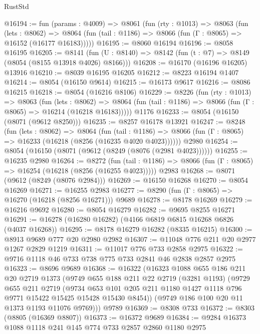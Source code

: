 \begin{lexlean}{RustStd}
\begin{coremodule}
@16194 := fun (params : @4009) =>
  @8061
    (fun (rty : @1013) =>
    @8063
      (fun (lets : @8062) =>
      @8064 (fun (tail : @1186) => @8066 (fun (Γ : @8065) => @16152 (@16177 @16183)))))
@16195 := @8060 @16194
@16196 := @8058 @16195
@16205 := @8141
    (fun (U : @8140) => @8142 (fun (t : @7) => @8149 (@8054 (@8155 @13918 @4026) @8166)))
@16208 := @16170 (@16196 @16205) @13916
@16210 := @8039 @16195 @16205
@16212 := @8223 @16194 @1407
@16214 := @8054 (@16150 @9614)
@16215 := @16173 @9617
@16216 := @8086 @16215
@16218 := @8054 (@16216 @8106)
@16229 := @8226
    (fun (rty : @1013) =>
    @8063
      (fun (lets : @8062) =>
      @8064 (fun (tail : @1186) => @8066 (fun (Γ : @8065) => @16214 (@16218 @16183)))))
    @1176
@16233 := @8054 (@16150 (@8071 (@9612 @8250)))
@16235 := @8257 @16178 @13921
@16247 := @8248
    (fun (lets : @8062) =>
    @8064
      (fun (tail : @1186) =>
      @8066 (fun (Γ : @8065) => @16233 (@16218 (@8256 (@16235 @4020 @4023))))))
    @2980
@16254 := @8054 (@16150 (@8071 (@9612 (@8249 (@8076 (@2981 @4023))))))
@16255 := @16235 @2980
@16264 := @8272
    (fun (tail : @1186) => @8066 (fun (Γ : @8065) => @16254 (@16218 (@8256 (@16255 @4023)))))
    @2983
@16268 := @8071 (@9612 (@8249 (@8076 @2984)))
@16269 := @16150 @16268
@16270 := @8054 @16269
@16271 := @16255 @2983
@16277 := @8290 (fun (Γ : @8065) => @16270 (@16218 (@8256 @16271))) @9689
@16278 := @8178 @16269
@16279 := @16216 @9692
@16280 := @8054 @16279
@16282 := @9695 @8255 @16271
@16291 := @16278 (@16280 @16282) (@4166 @6819 @6815 @16268 @6826 (@4037 @16268))
@16295 := @8178 @16279 @16282 (@8335 @16215)
@16300 := @8913 @9689 @777 @20 @2980 @2982
@16307 := @11048 @776 @211 @20 @2977 @1267 @2829 @1219
@16311 := @11017 @776 @733 @2858 @2975
@16322 := @9716 @1118 @46 @733 @738 @775 @733 @2841 @46 @2838 @2857 @2975
@16323 := @8696 @9689
@16368 := @16322
    (@16323
      @1088
      @655
      @186
      @211
      @20
      @2719
      @1373
      (@9749
        @655
        @188
        @211
        @22
        @2719
        (@3281 @1193)
        (@9729
          @655
          @211
          @2719
          (@9734
            @653
            @101
            @205
            @211
            @1180
            @1427
            @1118
            @796
            @9771
            @15422
            @15425
            @15428
            @15430
            @8454))
        (@9749 @186 @100 @20 @11 @1373 @1193 @11076 @9769)))
    @9789
@16369 := @8308 @733
@16372 := @8303 (@8805 (@16369 @8807))
@16373 := @16372 @9689
@16384 := @9284 @16373 @1088 @1118 @241 @145 @774 @733 @2857 @2860 @1180 @2975

\end{coremodule}
\end{lexlean}
